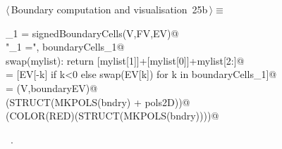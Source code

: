 \documentclass[11pt,oneside]{article}	%
\begin{document}
\begin{flushleft} \small
\begin{minipage}{\linewidth} \label{scrap62}
\protect{}$\langle\,$Boundary computation and visualisation\nobreak\ {\footnotesize 25b}$\,\rangle\equiv$
\vspace{-1ex}
\begin{list}{}{} \item
\mbox{}\verb@boundaryCells_1 = signedBoundaryCells(V,FV,EV)@\\
\mbox{}\verb@print "\nboundaryCells_1 =\n", boundaryCells_1@\\
\mbox{}\verb@def swap(mylist): return [mylist[1]]+[mylist[0]]+mylist[2:]@\\
\mbox{}\verb@boundaryEV = [EV[-k] if k<0 else swap(EV[k]) for k in boundaryCells_1]@\\
\mbox{}\verb@bndry = (V,boundaryEV)@\\
\mbox{}\verb@VIEW(STRUCT(MKPOLS(bndry) + pols2D))@\\
\mbox{}\verb@VIEW(COLOR(RED)(STRUCT(MKPOLS(bndry))))@\\
\mbox{}\verb@@{\NWsep}
\end{list}
\vspace{-1ex}
\footnotesize\addtolength{\baselineskip}{-1ex}
\begin{list}{}{\setlength{\itemsep}{-\parsep}\setlength{\itemindent}{-\leftmargin}}
\item \NWtxtMacroRefIn\ .
\end{list}
\end{minipage}\\[4ex]
\end{flushleft}
\end{document}
